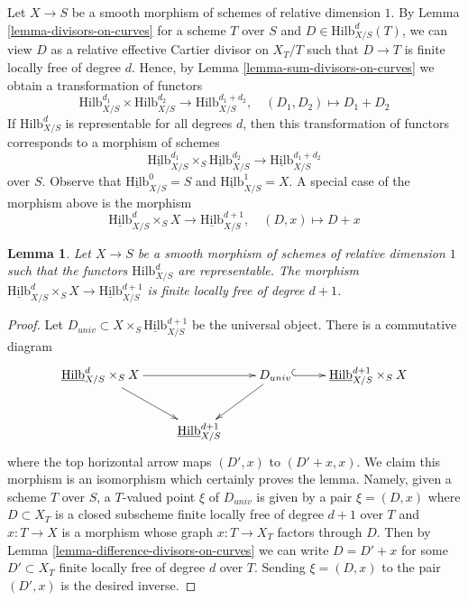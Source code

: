 \documentclass{stacks-project}
\theoremstyle{plain}
\newtheorem{lemma}[subsection]{Lemma}
\theoremstyle{definition}
\theoremstyle{remark}
\numberwithin{equation}{subsection}
\def\Hilbfunctor{\mathrm{Hilb}}
\begin{document}
\noindent
Let $X \to S$ be a smooth morphism of schemes of relative dimension $1$.
By Lemma \ref{lemma-divisors-on-curves} for a scheme $T$ over $S$ and
$D \in \Hilbfunctor^d_{X/S}(T)$, we can view $D$ as a relative
effective Cartier divisor on $X_T/T$ such that $D \to T$ is finite
locally free of degree $d$. Hence, by
Lemma \ref{lemma-sum-divisors-on-curves} we obtain a transformation
of functors
$$
\Hilbfunctor^{d_1}_{X/S} \times \Hilbfunctor^{d_2}_{X/S}
\longrightarrow
\Hilbfunctor^{d_1 + d_2}_{X/S},\quad
(D_1, D_2) \longmapsto D_1 + D_2
$$
If $\Hilbfunctor^d_{X/S}$ is representable for all degrees $d$, then
this transformation of functors corresponds to a morphism of schemes
$$
\underline{\Hilbfunctor}^{d_1}_{X/S}
\times_S
\underline{\Hilbfunctor}^{d_2}_{X/S}
\longrightarrow
\underline{\Hilbfunctor}^{d_1 + d_2}_{X/S}
$$
over $S$. Observe that $\underline{\Hilbfunctor}^0_{X/S} = S$ and
$\underline{\Hilbfunctor}^1_{X/S} = X$.
A special case of the morphism above is the morphism
$$
\underline{\Hilbfunctor}^d_{X/S} \times_S X
\longrightarrow
\underline{\Hilbfunctor}^{d + 1}_{X/S},\quad
(D, x) \longmapsto D + x
$$

\begin{lemma}
\label{lemma-universal-object}
Let $X \to S$ be a smooth morphism of schemes of relative dimension $1$
such that the functors $\Hilbfunctor^d_{X/S}$ are representable. The morphism
$\underline{\Hilbfunctor}^d_{X/S} \times_S X \to
\underline{\Hilbfunctor}^{d + 1}_{X/S}$
is finite locally free of degree $d + 1$.
\end{lemma}

\begin{proof}
Let $D_{univ} \subset X \times_S \underline{\Hilbfunctor}^{d + 1}_{X/S}$
be the universal object. There is a commutative diagram
$$
\xymatrix{
\underline{\Hilbfunctor}^d_{X/S} \times_S X \ar[rr] \ar[rd] & &
D_{univ} \ar[ld] \ar@{^{(}->}[r] &
\underline{\Hilbfunctor}^{d + 1}_{X/S} \times_S X \\
& \underline{\Hilbfunctor}^{d + 1}_{X/S}
}
$$
where the top horizontal arrow maps $(D', x)$ to $(D' + x, x)$.
We claim this morphism is an isomorphism
which certainly proves the lemma. Namely, given a scheme $T$ over $S$,
a $T$-valued point $\xi$ of $D_{univ}$ is given by a pair $\xi = (D, x)$
where $D \subset X_T$ is a closed subscheme finite locally free
of degree $d + 1$ over $T$ and $x : T \to X$ is a morphism whose
graph $x : T \to X_T$ factors through $D$. Then by
Lemma \ref{lemma-difference-divisors-on-curves}
we can write $D = D' + x$ for some $D' \subset X_T$ finite locally
free of degree $d$ over $T$. Sending $\xi = (D, x)$ to the pair
$(D', x)$ is the desired inverse.
\end{proof}
\end{document}
